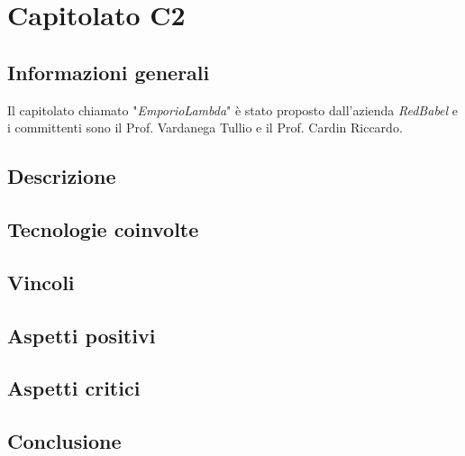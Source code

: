 \section{Capitolato C2}

\subsection{Informazioni generali}{

Il capitolato chiamato "\textit{EmporioLambda}" è stato proposto dall'azienda \textit{RedBabel} e i committenti sono il Prof. Vardanega Tullio e il Prof. Cardin Riccardo.
}

\subsection{Descrizione}{

}

\subsection{Tecnologie coinvolte}{

}

\subsection{Vincoli}{

}

\subsection{Aspetti positivi}{

}

\subsection{Aspetti critici}{

}

\subsection{Conclusione}{

}

